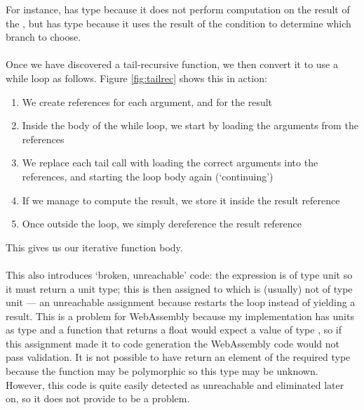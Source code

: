 For instance,  has type  because it does not perform computation on the result of the , but  has type  because it uses the result of the condition to determine which branch to choose.
\\\\
Once we have discovered a tail-recursive function, we then convert it to use a while loop as follows. Figure \ref{fig:tailrec} shows this in action:
\begin{enumerate}
\item We create references for each argument, and for the result
\item Inside the body of the while loop, we start by loading the arguments from the references
\item We replace each tail call with loading the correct arguments into the references, and starting the loop body again (`continuing')
\item If we manage to compute the result, we store it inside the result reference
\item Once outside the loop, we simply dereference the result reference
\end{enumerate}
This gives us our iterative function body.
\\\\
This also introduces `broken, unreachable' code: the  expression is of type unit so it must return a unit type; this is then assigned to  which is (usually) not of type unit --- an unreachable assignment because  restarts the loop instead of yielding a result. This is a problem for WebAssembly because my implementation has units as type  and a function that returns a float would expect a value of type , so if this assignment made it to code generation the WebAssembly code would not pass validation. It is not possible to have  return an element of the required type because the function may be polymorphic so this type may be unknown. However, this code is quite easily detected as unreachable and eliminated later on, so it does not provide to be a problem.


